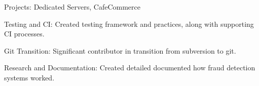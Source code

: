 \item Projects: Dedicated Servers, CafeCommerce

\item Testing and CI: Created testing framework and practices, along with supporting CI processes. %
\item Git Transition: Significant contributor in transition from subversion to git.
\item Research and Documentation: Created detailed documented how fraud detection systems worked.

